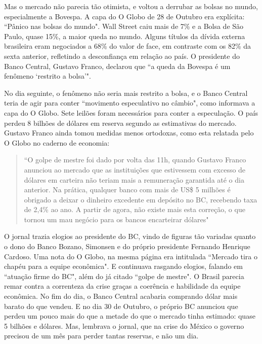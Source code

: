 \documentclass{article}
\begin{document}
Mas o mercado não parecia tão otimista, e voltou a derrubar as bolsas no mundo, especialmente a Bovespa. A capa do O Globo de 28 de Outubro era explícita: ``Pânico nas bolsas do mundo". Wall Street caiu mais de 7\% e a Bolsa de São Paulo, quase 15\%, a maior queda no mundo. Alguns títulos da dívida externa brasileira eram negociados a 68\% do valor de face, em contraste com os 82\% da sexta anterior, refletindo a desconfiança em relação ao país. O presidente do Banco Central, Gustavo Franco, declarou que ``a queda da Bovespa é um fenômeno `restrito a bolsa'".

No dia seguinte, o fenômeno não seria mais restrito a bolsa, e o Banco Central teria de agir para  conter ``movimento especulativo no câmbio", como informava a capa do O Globo. Sete leilões foram necessários para conter a especulação. O país perdeu 8 bilhões de dólares em reserva segundo as estimativas do mercado. Gustavo Franco ainda tomou medidas menos ortodoxas, como esta relatada pelo O Globo no caderno de economia:

\begin{quote}
``O golpe de mestre foi dado por volta das 11h, quando Gustavo Franco anunciou ao mercado que as instituições que estivessem com excesso de dólares em carteira não teriam mais a remuneração garantida até o dia anterior. Na prática, qualquer banco com mais de US\$ 5 milhões é obrigado a deixar o dinheiro excedente em depósito no BC, recebendo taxa de 2,4\% ao ano. A partir de agora, não existe mais esta correção, o que tornou um mau negócio para os bancos encarteirar dólares"

\end{quote}     

O jornal trazia elogios ao presidente do BC, vindo de figuras tão variadas quanto o dono do Banco Bozano, Simonsen e do próprio presidente Fernando Henrique Cardoso. Uma nota do O Globo, na mesma página era intitulada ``Mercado tira o chapéu para a equipe econômica". E continuava rasgando elogios, falando em ``atuação firme do BC", além do já citado ``golpe de mestre". O Brasil parecia remar contra a correnteza da crise graças a coerência e habilidade da equipe econômica. No fim do dia, o Banco Central acabaria comprando dólar mais barato do que vendeu. E no dia 30 de Outubro, o próprio BC anunciou que perdeu um pouco mais do que a metade do que o mercado tinha estimado: quase 5 bilhões e dólares. Mas, lembrava o jornal, que na crise do México o governo precisou de um mês para perder tantas reservas, e não um dia. 
\end{document}
